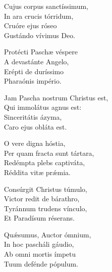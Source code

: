 Cujus corpus san\-ctíssimum,\\
In ara crucis tórridum,\\
Cruóre ejus róseo\\
Gustándo vívimus Deo.

Proté\-cti Paschæ véspere\\
A devastánte Angelo,\\
Eré\-pti de duríssimo\\
Pharaónis império.

Jam Pascha nostrum Christus est,\\
Qui immolátus agnus est:\\
Sinceritátis ázyma,\\
Caro ejus obláta est.

O vere digna hóstia,\\
Per quam fra\-cta sunt tártara,\\
Red\-ém\-pta plebs ca\-ptiváta,\\
Réddita vitæ prǽmia.

Consúrgit Christus túmulo,\\
Victor redit de bárathro,\\
Tyránnum trudens vínculo,\\
Et Paradísum réserans.

Quǽsumus, Au\-ctor ómnium,\\
In hoc pascháli gáudio,\\
Ab omni mortis ímpetu\\
Tuum defénde pópulum.

